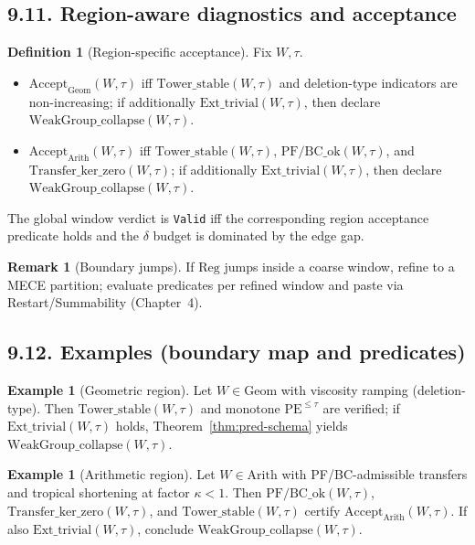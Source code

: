 \documentclass[11pt]{article}
\numberwithin{equation}{section}
\theoremstyle{plain}
\theoremstyle{definition}
\theoremstyle{remark}
\DeclareRobustCommand{\hyp}{\nobreakdash-}
\theoremstyle{plain}
\theoremstyle{definition}
\numberwithin{equation}{section}
\theoremstyle{definition}
\newtheorem{definition}[theorem]{Definition}
\newtheorem{example}[theorem]{Example}
\newtheorem{remark}[theorem]{Remark}
\numberwithin{equation}{section}
\theoremstyle{plain}
\theoremstyle{definition}
\theoremstyle{remark}
\begin{document}
\subsection*{9.11. Region\hyp aware diagnostics and acceptance}
\begin{definition}[Region\hyp specific acceptance]\label{def:region-accept}
Fix \(W,\tau\).
\begin{itemize}
  \item \(\mathrm{Accept}_{\mathrm{Geom}}(W,\tau)\) iff \(\mathrm{Tower\_stable}(W,\tau)\) and deletion\hyp type indicators are non\hyp increasing; if additionally \(\mathrm{Ext\_trivial}(W,\tau)\), then declare \(\mathrm{WeakGroup\_collapse}(W,\tau)\).
  \item \(\mathrm{Accept}_{\mathrm{Arith}}(W,\tau)\) iff \(\mathrm{Tower\_stable}(W,\tau)\), \(\mathrm{PF/BC\_ok}(W,\tau)\), and \(\mathrm{Transfer\_ker\_zero}(W,\tau)\); if additionally \(\mathrm{Ext\_trivial}(W,\tau)\), then declare \(\mathrm{WeakGroup\_collapse}(W,\tau)\).
\end{itemize}
The global window verdict is \texttt{Valid} iff the corresponding region acceptance predicate holds and the $\delta$ budget is dominated by the edge gap.
\end{definition}

\begin{remark}[Boundary jumps]
If \(\mathrm{Reg}\) jumps inside a coarse window, refine to a MECE partition; evaluate predicates per refined window and paste via Restart/Summability (Chapter~4).
\end{remark}

\subsection*{9.12. Examples (boundary map and predicates)}
\begin{example}[Geometric region]
Let \(W\in\mathrm{Geom}\) with viscosity ramping (deletion\hyp type).
Then \(\mathrm{Tower\_stable}(W,\tau)\) and monotone \(\mathrm{PE}^{\le\tau}\) are verified; if \(\mathrm{Ext\_trivial}(W,\tau)\) holds, Theorem~\ref{thm:pred-schema} yields \(\mathrm{WeakGroup\_collapse}(W,\tau)\).
\end{example}

\begin{example}[Arithmetic region]
Let \(W\in\mathrm{Arith}\) with PF/BC\hyp admissible transfers and tropical shortening at factor \(\kappa<1\).
Then \(\mathrm{PF/BC\_ok}(W,\tau)\), \(\mathrm{Transfer\_ker\_zero}(W,\tau)\), and \(\mathrm{Tower\_stable}(W,\tau)\) certify \(\mathrm{Accept}_{\mathrm{Arith}}(W,\tau)\).
If also \(\mathrm{Ext\_trivial}(W,\tau)\), conclude \(\mathrm{WeakGroup\_collapse}(W,\tau)\).
\end{example}
\end{document}
